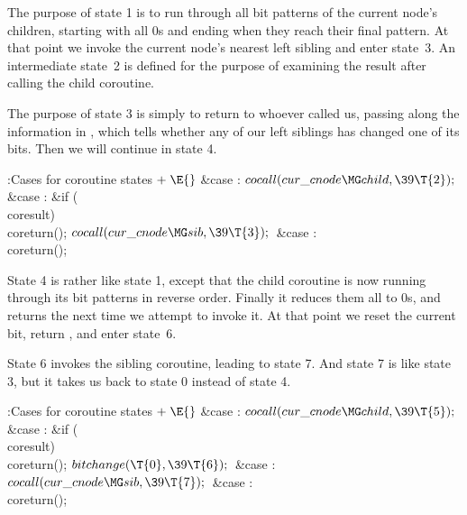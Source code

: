 The purpose of state 1 is to run through all bit
patterns of the
current node's children, starting with all 0s and ending when they reach their
final pattern.
At that point we invoke the current node's nearest left sibling
and enter state~3. An intermediate state~2 is defined for the purpose
of examining the result after calling the child coroutine.

The purpose of state 3 is simply to return to whoever called us,
passing along the information in , which tells whether
any of our left siblings has changed one of its bits. Then we will
continue in state 4.

\Y\B\4:Cases for coroutine states\X${}\mathrel+\E{}$\6
\4\&{case} :\5
${}\\{cocall}(\\{cur\_cnode}\MG\\{child},\39\T{2});{}$\6
\4\&{case} :\5
\&{if} (\\{coresult})\1\5
\\{coreturn}();\2\6
${}\\{cocall}(\\{cur\_cnode}\MG\\{sib},\39\T{3});{}$\6
\4\&{case} :\5
\\{coreturn}();\par
\fi

State 4 is rather like state 1, except that the child
coroutine is now
running through its bit patterns in reverse order. Finally it reduces them
all to 0s, and returns  the next time we attempt to invoke it.
At that point we reset the current bit, return , and enter
state~6.

State 6 invokes the sibling coroutine, leading to state 7.
And state 7 is like state 3, but it takes us back to state 0 instead
of state 4.

\Y\B\4:Cases for coroutine states\X${}\mathrel+\E{}$\6
\4\&{case} :\5
${}\\{cocall}(\\{cur\_cnode}\MG\\{child},\39\T{5});{}$\6
\4\&{case} :\5
\&{if} (\\{coresult})\1\5
\\{coreturn}();\2\6
${}\\{bitchange}(\T{0},\39\T{6});{}$\6
\4\&{case} :\5
${}\\{cocall}(\\{cur\_cnode}\MG\\{sib},\39\T{7});{}$\6
\4\&{case} :\5
\\{coreturn}();\par
\fi

